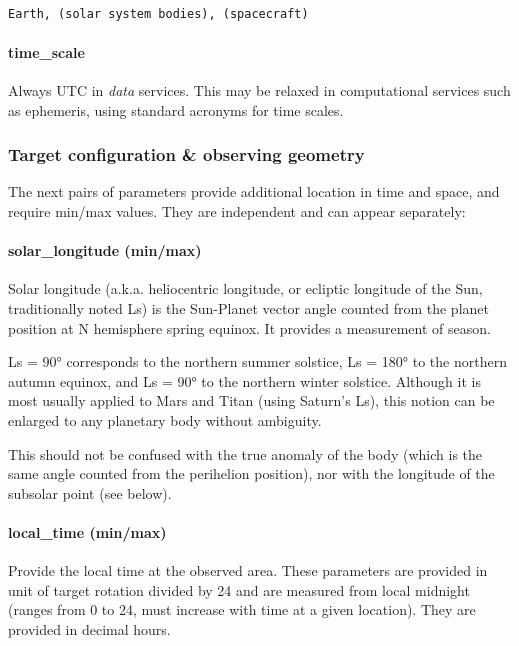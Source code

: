 \documentclass[11pt,a4paper]{ivoa}
\begin{document}
\begin{verbatim}

Earth, (solar system bodies), (spacecraft)

\end{verbatim}

\paragraph{time\_scale}

Always UTC in \emph{data} services. This may be relaxed in computational services such as ephemeris, using standard acronyms for time scales.

\subsubsection{Target configuration \& observing geometry}

The next pairs of parameters provide additional location in time and space, and require min/max values. They are independent and can appear separately:

\paragraph{solar\_longitude (min/max)}

Solar longitude (a.k.a. heliocentric longitude, or ecliptic longitude of the Sun, traditionally noted Ls) is the Sun-Planet vector angle counted from the planet position at N hemisphere spring equinox. It provides a measurement of season.

Ls = 90° corresponds to the northern summer solstice, Ls = 180° to the northern autumn equinox, and Ls = 90° to the northern winter solstice. Although it is most usually applied to Mars and Titan (using Saturn's Ls), this notion can be enlarged to any planetary body without ambiguity.

This should not be confused with the true anomaly of the body (which is the same angle counted from the perihelion position), nor with the longitude of the subsolar point (see below).

\paragraph{local\_time (min/max)}

Provide the local time at the observed area. These parameters are provided in unit of target rotation divided by 24 and are measured from local midnight (ranges from 0 to 24, must increase with time at a given location). They are provided in decimal hours.
\end{document}

